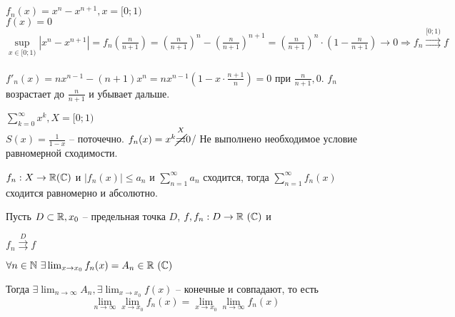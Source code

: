 \begin{Example}
	$f_n(x) = x^n - x^{n+1}, x = [0;1)$\\
	$f(x) = 0$\\
	$\underset{x \in [0;1)}{\sup} |x^n - x^{n+1}| = f_n (\frac{n}{n+1}) = 
	\left(\frac{n}{n+1}\right)^n - \left(\frac{n}{n+1}\right)^{n+1} = 
	\left(\frac{n}{n+1}\right)^n \cdot (1 - \frac{n}{n+1}) \to 0 \Rightarrow f_n \overset{[0;1)}{\rightrightarrows} f$\\ \\
	$f'_n(x) = nx^{n-1} - (n+1) x^n = nx^{n-1} (1 - x \cdot \frac{n+1}{n}) = 0$ при $\frac{n}{n+1}, 0$.
	$f_n$ возрастает до $\frac{n}{n+1}$ и убывает дальше. 
\end{Example}

\begin{Example}
	$\sum_{k=0}^{\infty} x^k, X = [0;1)$\\
	$S(x) = \frac{1}{1-x}$ -- поточечно. 
	$f_n(x) = x^k \overset{X}{\cancel{\rightrightarrows}} 0$/ Не выполнено необходимое условие равномерной 
	сходимости. 
\end{Example}

\begin{Thm}
	$f_n: X \to \mathbb{R} (\mathbb{C})$ и $|f_n(x)| \leqslant a_n$ и $\sum_{n=1}^{\infty} a_n$ сходится, тогда
	$\sum_{n=1}^{\infty} f_n(x)$ сходится равномерно и абсолютно. 
\end{Thm}


\begin{Thm}
	Пусть $D \subset \mathbb{R}, x_0$ -- предельная точка $D$, $f, f_n : D \to \mathbb{R} \ (\mathbb{C})$ и
	\begin{MyList}
		\item $f_n \overset{D}{\rightrightarrows} f$
		\item $\forall n \in \mathbb{N} \ \exists \lim_{x \to x_0} f_n(x) = A_n \in \mathbb{R} \ (\mathbb{C})$
	\end{MyList}  
	Тогда $\exists \lim_{n \to \infty} A_n, \exists \lim_{x \to x_0} f(x)$ -- конечные и совпадают, то есть
	\[\lim_{n \to \infty} \lim_{x \to x_0} f_n(x) = \lim_{x \to x_0} \lim_{n \to \infty}f_n(x)\]
\end{Thm}

